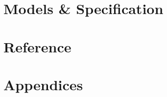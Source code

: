 \tableofcontents
\listoffigures
\listoftables


\part{Models \& Specification}\label{part:models}






\part{Reference}\label{part:ref}





\part{Appendices}\label{part:app}
\appendix








\PrintGlossaries


